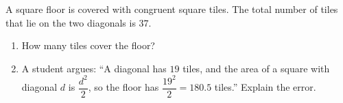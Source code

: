 A square floor is covered with congruent square tiles. The total number of tiles that lie on the two diagonals is $37$.
\begin{enumerate}
\item[(a)] How many tiles cover the floor?
\item[(b)] A student argues: ``A diagonal has $19$ tiles, and the area of a square with diagonal $d$ is $\dfrac{d^2}{2}$, so the floor has $\dfrac{19^2}{2}=180.5$ tiles.'' Explain the error.
\end{enumerate}
